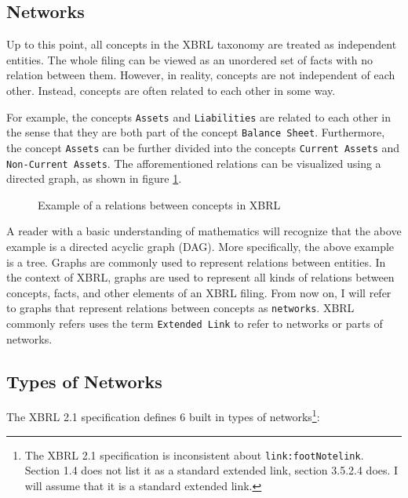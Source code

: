 \subsection{Networks}

Up to this point, all concepts in the XBRL taxonomy are treated as independent entities.
The whole filing can be viewed as an unordered set of facts with no relation between them.
However, in reality, concepts are not independent of each other.
Instead, concepts are often related to each other in some way.

For example, the concepts \texttt{Assets} and \texttt{Liabilities} are related to each other in the sense that they are both part of the concept \texttt{Balance Sheet}.
Furthermore, the concept \texttt{Assets} can be further divided into the concepts \texttt{Current Assets} and \texttt{Non-Current Assets}.
The afforementioned relations can be visualized using a directed graph, as shown in figure \ref{fig:example_visualization_network_xbrl}.

\begin{figure}[H]
    \caption{Example of a relations between concepts in XBRL}
    \label{fig:example_visualization_network_xbrl}
\end{figure}

A reader with a basic understanding of mathematics will recognize that the above example is a directed acyclic graph (DAG).
More specifically, the above example is a tree.
Graphs are commonly used to represent relations between entities.
In the context of XBRL, graphs are used to represent all kinds of relations between concepts, facts, and other elements of an XBRL filing.
From now on, I will refer to graphs that represent relations between concepts as \texttt{networks}.
XBRL commonly refers uses the term \texttt{Extended Link} to refer to networks or parts of networks.

\subsection{Types of Networks}

The XBRL 2.1 specification defines 6 built in types of networks\cite{xbrl21_terminology}\footnote[1]{The XBRL 2.1 specification is inconsistent about \texttt{link:footNotelink}. Section 1.4 does not list it as a standard extended link, section 3.5.2.4 does. I will assume that it is a standard extended link.}:

